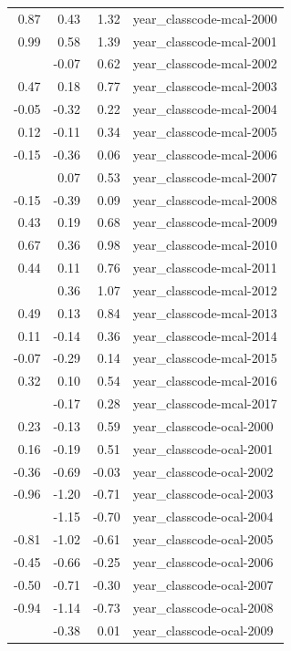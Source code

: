 \documentclass[]{article}
\begin{document}
\begin{longtable}[t]{rrrl}
0.87 & 0.43 & 1.32 & year\_classcode-mcal-2000\\
0.99 & 0.58 & 1.39 & year\_classcode-mcal-2001\\
\addlinespace
0.27 & -0.07 & 0.62 & year\_classcode-mcal-2002\\
0.47 & 0.18 & 0.77 & year\_classcode-mcal-2003\\
-0.05 & -0.32 & 0.22 & year\_classcode-mcal-2004\\
0.12 & -0.11 & 0.34 & year\_classcode-mcal-2005\\
-0.15 & -0.36 & 0.06 & year\_classcode-mcal-2006\\
\addlinespace
0.30 & 0.07 & 0.53 & year\_classcode-mcal-2007\\
-0.15 & -0.39 & 0.09 & year\_classcode-mcal-2008\\
0.43 & 0.19 & 0.68 & year\_classcode-mcal-2009\\
0.67 & 0.36 & 0.98 & year\_classcode-mcal-2010\\
0.44 & 0.11 & 0.76 & year\_classcode-mcal-2011\\
\addlinespace
0.71 & 0.36 & 1.07 & year\_classcode-mcal-2012\\
0.49 & 0.13 & 0.84 & year\_classcode-mcal-2013\\
0.11 & -0.14 & 0.36 & year\_classcode-mcal-2014\\
-0.07 & -0.29 & 0.14 & year\_classcode-mcal-2015\\
0.32 & 0.10 & 0.54 & year\_classcode-mcal-2016\\
\addlinespace
0.05 & -0.17 & 0.28 & year\_classcode-mcal-2017\\
0.23 & -0.13 & 0.59 & year\_classcode-ocal-2000\\
0.16 & -0.19 & 0.51 & year\_classcode-ocal-2001\\
-0.36 & -0.69 & -0.03 & year\_classcode-ocal-2002\\
-0.96 & -1.20 & -0.71 & year\_classcode-ocal-2003\\
\addlinespace
-0.93 & -1.15 & -0.70 & year\_classcode-ocal-2004\\
-0.81 & -1.02 & -0.61 & year\_classcode-ocal-2005\\
-0.45 & -0.66 & -0.25 & year\_classcode-ocal-2006\\
-0.50 & -0.71 & -0.30 & year\_classcode-ocal-2007\\
-0.94 & -1.14 & -0.73 & year\_classcode-ocal-2008\\
\addlinespace
-0.19 & -0.38 & 0.01 & year\_classcode-ocal-2009\\

\end{longtable}
\end{document}
